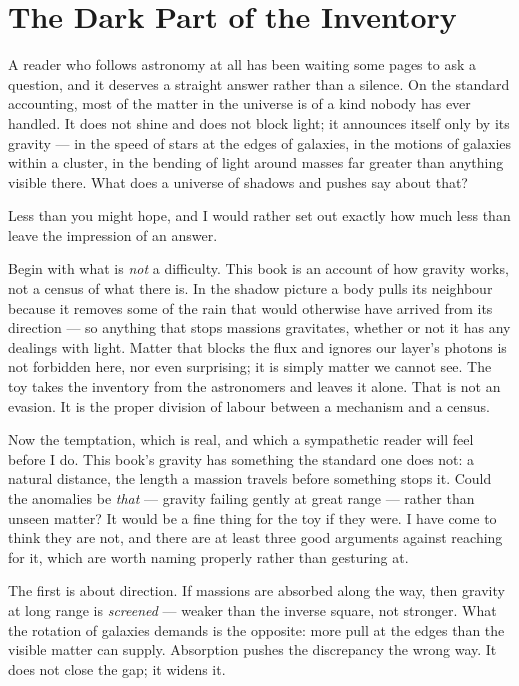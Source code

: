 \section{The Dark Part of the Inventory}

A reader who follows astronomy at all has been waiting some pages to ask a question, and it deserves a straight answer rather than a silence. On the standard accounting, most of the matter in the universe is of a kind nobody has ever handled. It does not shine and does not block light; it announces itself only by its gravity --- in the speed of stars at the edges of galaxies, in the motions of galaxies within a cluster, in the bending of light around masses far greater than anything visible there. What does a universe of shadows and pushes say about that?

Less than you might hope, and I would rather set out exactly how much less than leave the impression of an answer.

Begin with what is \emph{not} a difficulty. This book is an account of how gravity works, not a census of what there is. In the shadow picture a body pulls its neighbour because it removes some of the rain that would otherwise have arrived from its direction --- so anything that stops massions gravitates, whether or not it has any dealings with light. Matter that blocks the flux and ignores our layer's photons is not forbidden here, nor even surprising; it is simply matter we cannot see. The toy takes the inventory from the astronomers and leaves it alone. That is not an evasion. It is the proper division of labour between a mechanism and a census.

Now the temptation, which is real, and which a sympathetic reader will feel before I do. This book's gravity has something the standard one does not: a natural distance, the length a massion travels before something stops it. Could the anomalies be \emph{that} --- gravity failing gently at great range --- rather than unseen matter? It would be a fine thing for the toy if they were. I have come to think they are not, and there are at least three good arguments against reaching for it, which are worth naming properly rather than gesturing at.

The first is about direction. If massions are absorbed along the way, then gravity at long range is \emph{screened} --- weaker than the inverse square, not stronger. What the rotation of galaxies demands is the opposite: more pull at the edges than the visible matter can supply. Absorption pushes the discrepancy the wrong way. It does not close the gap; it widens it.

